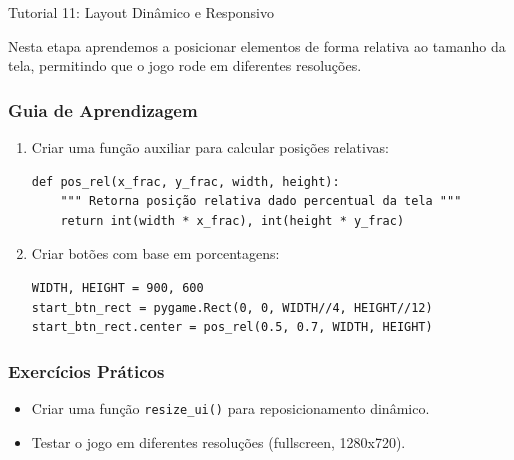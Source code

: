 \documentclass[11pt,a4paper]{article}
\begin{document}
\begin{boxTutorial}{Tutorial 11: Layout Dinâmico e Responsivo}
\label{sec:Tutorial11_LayoutDinamico}

    Nesta etapa aprendemos a posicionar elementos de forma relativa ao tamanho da tela, permitindo que o jogo rode em diferentes resoluções.
    
    \subsubsection*{Guia de Aprendizagem}
    \begin{enumerate}
        \item Criar uma função auxiliar para calcular posições relativas:
        \begin{verbatim}
def pos_rel(x_frac, y_frac, width, height):
    """ Retorna posição relativa dado percentual da tela """
    return int(width * x_frac), int(height * y_frac)
        \end{verbatim}
    
        \item Criar botões com base em porcentagens:
        \begin{verbatim}
WIDTH, HEIGHT = 900, 600
start_btn_rect = pygame.Rect(0, 0, WIDTH//4, HEIGHT//12)
start_btn_rect.center = pos_rel(0.5, 0.7, WIDTH, HEIGHT)
        \end{verbatim}
    \end{enumerate}
    
    \subsubsection*{Exercícios Práticos}
    \begin{itemize}
        \item Criar uma função \texttt{resize\_ui()} para reposicionamento dinâmico.
        \item Testar o jogo em diferentes resoluções (fullscreen, 1280x720).
    \end{itemize}
\end{boxTutorial}
\end{document}
